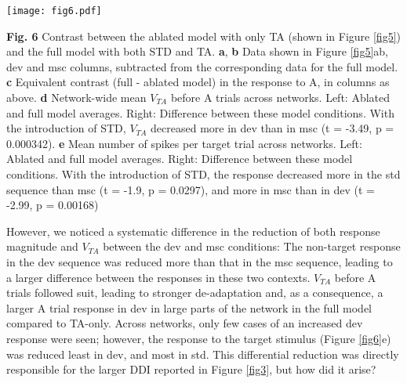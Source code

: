\documentclass[pdflatex,referee,iicol,sn-basic]{sn-jnl}
\theoremstyle{thmstyleone}%
\theoremstyle{thmstyletwo}%
\theoremstyle{thmstylethree}%
\begin{document}
\begin{figure*}%
    \centering
    \texttt{[image: fig6.pdf]}
    \caption{Contrast between the ablated model with only TA (shown in Figure \ref{fig5}) and the full model with both STD and TA. \textbf{a}, \textbf{b} Data shown in Figure \ref{fig5}ab, dev and msc columns, subtracted from the corresponding data for the full model. \textbf{c} Equivalent contrast (full - ablated model) in the response to A, in columns as above. \textbf{d} Network-wide mean $V_{TA}$ before A trials across networks. Left: Ablated and full model averages. Right: Difference between these model conditions. With the introduction of STD, $V_{TA}$ decreased more in dev than in msc (t = -3.49, p = 0.000342). \textbf{e} Mean number of spikes per target trial across networks. Left: Ablated and full model averages. Right: Difference between these model conditions. With the introduction of STD, the response decreased more in the std sequence than msc (t = -1.9, p = 0.0297), and more in msc than in dev (t = -2.99, p = 0.00168)}
    \label{fig6}
\end{figure*}

\textbf{Fig. 6} Contrast between the ablated model with only TA (shown in Figure \ref{fig5}) and the full model with both STD and TA. \textbf{a}, \textbf{b} Data shown in Figure \ref{fig5}ab, dev and msc columns, subtracted from the corresponding data for the full model. \textbf{c} Equivalent contrast (full - ablated model) in the response to A, in columns as above. \textbf{d} Network-wide mean $V_{TA}$ before A trials across networks. Left: Ablated and full model averages. Right: Difference between these model conditions. With the introduction of STD, $V_{TA}$ decreased more in dev than in msc (t = -3.49, p = 0.000342). \textbf{e} Mean number of spikes per target trial across networks. Left: Ablated and full model averages. Right: Difference between these model conditions. With the introduction of STD, the response decreased more in the std sequence than msc (t = -1.9, p = 0.0297), and more in msc than in dev (t = -2.99, p = 0.00168)

However, we noticed a systematic difference in the reduction of both response magnitude and $V_{TA}$ between the dev and msc conditions: The non-target response in the dev sequence was reduced more than that in the msc sequence, leading to a larger difference between the responses in these two contexts. $V_{TA}$ before A trials followed suit, leading to stronger de-adaptation and, as a consequence, a larger A trial response in dev in large parts of the network in the full model compared to TA-only. Across networks, only few cases of an increased dev response were seen; however, the response to the target stimulus (Figure \ref{fig6}e) was reduced least in dev, and most in std. This differential reduction was directly responsible for the larger DDI reported in Figure \ref{fig3}, but how did it arise?
\end{document}
